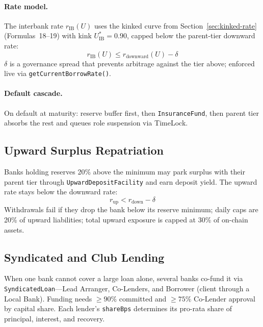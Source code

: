 \documentclass[12pt, a4paper]{report}
\begin{document}
\paragraph{Rate model.}
The interbank rate $r_{\text{IB}}(U)$ uses the kinked curve from Section~\ref{sec:kinked-rate} (Formulas~18--19) with kink $U^{*}_{\text{IB}} = 0.90$, capped below the parent-tier downward rate:
\begin{equation}
r_{\text{IB}}(U) \le r_{\text{downward}}(U) - \delta
\end{equation}
\noindent $\delta$ is a governance spread that prevents arbitrage against the tier above; enforced live via \texttt{getCurrentBorrowRate()}.

\paragraph{Default cascade.}
On default at maturity: reserve buffer first, then \texttt{InsuranceFund}, then parent tier absorbs the rest and queues role suspension via TimeLock.

\subsection{Upward Surplus Repatriation}
\label{sec:upward-flow}

Banks holding reserves 20\% above the minimum may park surplus with their parent tier through \texttt{UpwardDepositFacility} and earn deposit yield. The upward rate stays below the downward rate:
\begin{equation}
r_{\text{up}} < r_{\text{down}} - \delta
\end{equation}
\noindent Withdrawals fail if they drop the bank below its reserve minimum; daily caps are 20\% of upward liabilities; total upward exposure is capped at 30\% of on-chain assets.

\subsection{Syndicated and Club Lending}
\label{sec:syndicated-lending}

When one bank cannot cover a large loan alone, several banks co-fund it via \texttt{SyndicatedLoan}---Lead Arranger, Co-Lenders, and Borrower (client through a Local Bank). Funding needs $\ge 90\%$ committed and $\ge 75\%$ Co-Lender approval by capital share. Each lender's \texttt{shareBps} determines its pro-rata share of principal, interest, and recovery.
\end{document}
